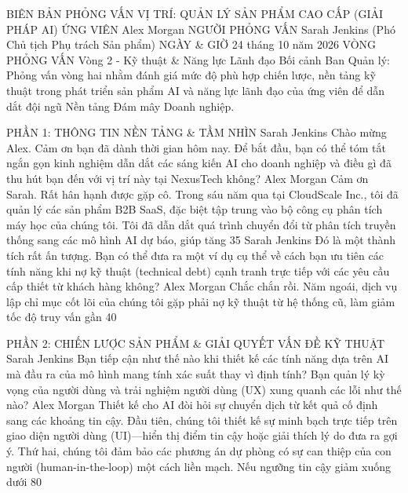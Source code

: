 \documentclass[12pt]{article}
\begin{document}
BIÊN BẢN PHỎNG VẤN
VỊ TRÍ: QUẢN LÝ SẢN PHẨM CAO CẤP (GIẢI PHÁP AI)
ỨNG VIÊN
Alex Morgan
NGƯỜI PHỎNG VẤN
Sarah Jenkins (Phó Chủ tịch Phụ trách Sản phẩm)
NGÀY & GIỜ
24 tháng 10 năm 2026
VÒNG PHỎNG VẤN
Vòng 2 - Kỹ thuật & Năng lực Lãnh đạo
Bối cảnh Ban Quản lý: Phỏng vấn vòng hai nhằm đánh giá mức độ phù hợp chiến lược, nền tảng kỹ thuật trong phát triển sản phẩm AI và năng lực lãnh đạo của ứng viên để dẫn dắt đội ngũ Nền tảng Đám mây Doanh nghiệp.

PHẦN 1: THÔNG TIN NỀN TẢNG & TẦM NHÌN
Sarah Jenkins
Chào mừng Alex. Cảm ơn bạn đã dành thời gian hôm nay. Để bắt đầu, bạn có thể tóm tắt ngắn gọn kinh nghiệm dẫn dắt các sáng kiến AI cho doanh nghiệp và điều gì đã thu hút bạn đến với vị trí này tại NexusTech không?
Alex Morgan
Cảm ơn Sarah. Rất hân hạnh được gặp cô. Trong sáu năm qua tại CloudScale Inc., tôi đã quản lý các sản phẩm B2B SaaS, đặc biệt tập trung vào bộ công cụ phân tích máy học của chúng tôi. Tôi đã dẫn dắt quá trình chuyển đổi từ phân tích truyền thống sang các mô hình AI dự báo, giúp tăng 35%
Sarah Jenkins
Đó là một thành tích rất ấn tượng. Bạn có thể đưa ra một ví dụ cụ thể về cách bạn ưu tiên các tính năng khi nợ kỹ thuật (technical debt) cạnh tranh trực tiếp với các yêu cầu cấp thiết từ khách hàng không?
Alex Morgan
Chắc chắn rồi. Năm ngoái, dịch vụ lập chỉ mục cốt lõi của chúng tôi gặp phải nợ kỹ thuật từ hệ thống cũ, làm giảm tốc độ truy vấn gần 40%

PHẦN 2: CHIẾN LƯỢC SẢN PHẨM & GIẢI QUYẾT VẤN ĐỀ KỸ THUẬT
Sarah Jenkins
Bạn tiếp cận như thế nào khi thiết kế các tính năng dựa trên AI mà đầu ra của mô hình mang tính xác suất thay vì định tính? Bạn quản lý kỳ vọng của người dùng và trải nghiệm người dùng (UX) xung quanh các lỗi như thế nào?
Alex Morgan
Thiết kế cho AI đòi hỏi sự chuyển dịch từ kết quả cố định sang các khoảng tin cậy. Đầu tiên, chúng tôi thiết kế sự minh bạch trực tiếp trên giao diện người dùng (UI)—hiển thị điểm tin cậy hoặc giải thích lý do đưa ra gợi ý. Thứ hai, chúng tôi đảm bảo các phương án dự phòng có sự can thiệp của con người (human-in-the-loop) một cách liền mạch. Nếu ngưỡng tin cậy giảm xuống dưới 80%
\end{document}
